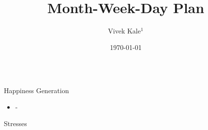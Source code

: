 \documentclass[serif, mathserif, final]{beamer}
\title{Month-Week-Day Plan}
\author{Vivek Kale$^1$}
\institute{$^1$ University of Illinois at Urbana-Champaign}
\date{\today}
\begin{document}
 
\begin{frame}{} 
  \begin{columns}
\begin{column}{0.25\linewidth} %
\begin{block} {Happiness Generation}

\begin{itemize}
\tiny \item \tiny -
\end{itemize} 
\end{block} 
  \begin{block}{ Stresses} 
    \begin{itemize}


\end{itemize}
\end{block}
\end{column}
\end{columns}
\end{frame}
\end{document}
